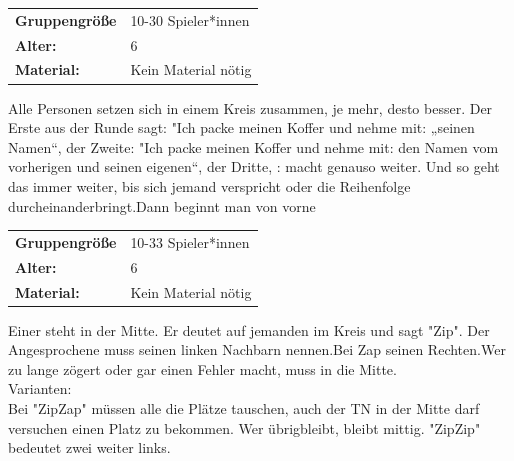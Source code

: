 \begin{table}[H]
\begin{tabular}{>{\bfseries}lp{8cm}}
   Gruppengröße   & 10-30 Spieler*innen\\
    Alter: & 6 \\
    Material: & Kein Material nötig \\ 
\end{tabular}
\end{table} 
Alle Personen setzen sich in einem Kreis zusammen, je mehr, desto besser. Der Erste aus der Runde sagt: "Ich packe meinen Koffer und nehme mit: „seinen Namen“, der Zweite: "Ich packe meinen Koffer und nehme mit: den Namen vom vorherigen und seinen eigenen“, der Dritte, : macht genauso weiter. 
Und so geht das immer weiter, bis sich jemand verspricht oder die Reihenfolge durcheinanderbringt.Dann  beginnt man von vorne \\



\begin{table}[H]
\begin{tabular}{>{\bfseries}lp{8cm}}
   Gruppengröße   & 10-33 Spieler*innen\\
    Alter: & 6 \\
    Material: & Kein Material nötig \\
\end{tabular}
\end{table} 
Einer steht in der Mitte. Er deutet auf jemanden im Kreis und sagt "Zip". Der Angesprochene muss seinen linken Nachbarn nennen.Bei Zap seinen Rechten.Wer zu lange zögert oder gar einen Fehler macht, muss in die Mitte. \\ \newline
    Varianten:\\ Bei "ZipZap" müssen alle die Plätze tauschen, auch der TN in der Mitte darf versuchen einen Platz zu bekommen. Wer übrigbleibt, bleibt mittig. "ZipZip" bedeutet zwei weiter links.\\



